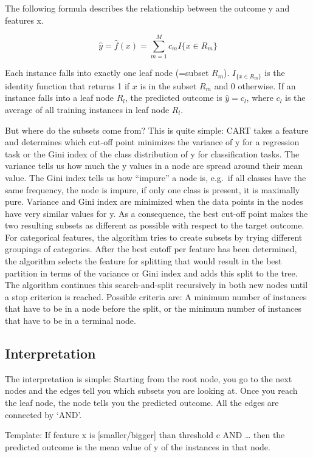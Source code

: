 \documentclass[
  12pt,
]{krantz}
\begin{document}
The following formula describes the relationship between the outcome y and features x.

\[\hat{y}=\hat{f}(x)=\sum_{m=1}^Mc_m{}I\{x\in{}R_m\}\]

Each instance falls into exactly one leaf node (=subset \(R_m\)).
\(I_{\{x\in{}R_m\}}\) is the identity function that returns 1 if \(x\) is in the subset \(R_m\) and 0 otherwise.
If an instance falls into a leaf node \(R_l\), the predicted outcome is \(\hat{y}=c_l\), where \(c_l\) is the average of all training instances in leaf node \(R_l\).

But where do the subsets come from?
This is quite simple:
CART takes a feature and determines which cut-off point minimizes the variance of y for a regression task or the Gini index of the class distribution of y for classification tasks.
The variance tells us how much the y values in a node are spread around their mean value.
The Gini index tells us how ``impure'' a node is, e.g.~if all classes have the same frequency, the node is impure, if only one class is present, it is maximally pure.
Variance and Gini index are minimized when the data points in the nodes have very similar values for y.
As a consequence, the best cut-off point makes the two resulting subsets as different as possible with respect to the target outcome.
For categorical features, the algorithm tries to create subsets by trying different groupings of categories.
After the best cutoff per feature has been determined, the algorithm selects the feature for splitting that would result in the best partition in terms of the variance or Gini index and adds this split to the tree.
The algorithm continues this search-and-split recursively in both new nodes until a stop criterion is reached.
Possible criteria are:
A minimum number of instances that have to be in a node before the split, or the minimum number of instances that have to be in a terminal node.

\hypertarget{interpretation-2}{%
\subsection{Interpretation}\label{interpretation-2}}

The interpretation is simple:
Starting from the root node, you go to the next nodes and the edges tell you which subsets you are looking at.
Once you reach the leaf node, the node tells you the predicted outcome.
All the edges are connected by `AND'.

Template: If feature x is {[}smaller/bigger{]} than threshold c AND \ldots{} then the predicted outcome is the mean value of y of the instances in that node.
\end{document}
